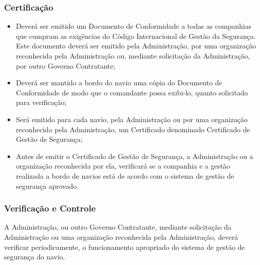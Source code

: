 \documentclass[../main.tex]{subfiles}
\begin{document}
  \subsubsection{Certificação}
   \begin{itemize}
    \item Deverá ser emitido um Documento de Conformidade a todas as companhias que cumpram as exigências do Código Internacional de Gestão da Segurança. Este documento deverá ser emitido pela Administração, por uma organização reconhecida pela Administração ou, mediante solicitação da Administração, por outro Governo Contratante;
    \item Deverá ser mantido a bordo do navio uma cópia do Documento de Conformidade de modo que o comandante possa exibi-lo, quanto solicitado para verificação;
    \item Será emitido para cada navio, pela Administração ou por uma organização reconhecida pela Administração, um Certificado denominado Certificado de Gestão de Segurança;
    \item Antes de emitir o Certificado de Gestão de Segurança, a Administração ou a organização reconhecida por ela, verificará se a companhia e a gestão realizada a bordo de navios está de acordo com o sistema de gestão de segurança aprovado. 
   \end{itemize}
  \subsubsection{Verificação e Controle}
   A Administração, ou outro Governo Contratante, mediante solicitação da Administração ou uma organização reconhecida pela Administração, deverá verificar periodicamente, o funcionamento apropriado do sistema de gestão de segurança do navio.
\end{document}
